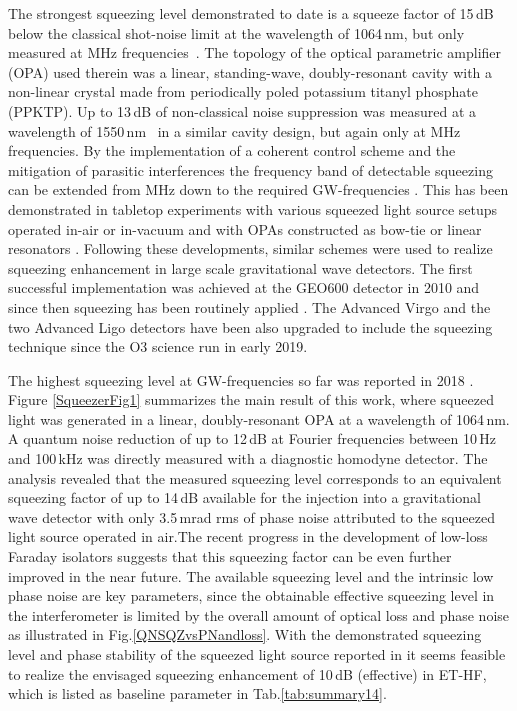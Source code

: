 %
The strongest squeezing level demonstrated to date is a squeeze factor of 15\,dB below the classical shot-noise limit at the wavelength of 1064\,nm, but only measured at MHz frequencies~\cite{Vahlbruch2016}. The topology of the optical parametric amplifier (OPA) used therein was a linear, standing-wave, doubly-resonant cavity with a non-linear crystal made from periodically poled potassium titanyl phosphate (PPKTP).  
%
Up to 13\,dB of non-classical noise suppression was measured at a wavelength of 1550\,nm~\cite{Schonbeck18} in a similar cavity design, but again only at MHz frequencies. 
%
By the implementation of a coherent control scheme \cite{Vahlbruch2006} and the mitigation of parasitic interferences the frequency band of detectable squeezing can be extended from MHz down to the required GW-frequencies \cite{Vahlbruch2007}. 
This has been demonstrated in tabletop experiments with various squeezed light source setups operated in-air or in-vacuum and with OPAs constructed as bow-tie or linear resonators \cite{Vahlbruch2006,Stefszky2012, Wade2016}.
%
Following these developments, similar schemes were used to realize squeezing enhancement in large scale gravitational wave detectors. 
The first successful implementation was achieved at the GEO600 detector in 2010 and since then squeezing has been routinely applied \cite{2011_Nat.Phys.7.962_LSC, Grote2013}. 
The Advanced Virgo and the two Advanced Ligo detectors have been also upgraded to include the squeezing technique since the O3 science run in early 2019.  
%

The highest squeezing level at GW-frequencies so far was reported in 2018 \cite{Mehmet2018}. Figure \ref{SqueezerFig1} summarizes the main result of this work, where squeezed light was generated in a linear, doubly-resonant OPA at a wavelength of 1064\,nm. A quantum noise reduction of up to 12\,dB at Fourier frequencies between 10\,Hz and 100\,kHz was directly measured with a diagnostic homodyne detector. The analysis revealed that the measured squeezing level corresponds to an equivalent squeezing factor of up to 14\,dB available for the injection into a gravitational wave detector with only 3.5\,mrad rms of phase noise attributed to the squeezed light source operated in air.The recent progress in the development of low-loss Faraday isolators \cite{Genin2018} suggests that this squeezing factor can be even further improved in the near future.
%
The available squeezing level and the intrinsic low phase noise are key parameters, since the obtainable effective squeezing level in the interferometer is limited by the overall amount of optical loss and phase noise as illustrated in Fig.\ref{QNSQZvsPNandloss}. 
%
With the demonstrated squeezing level and phase stability of the squeezed light source reported in \cite{Mehmet2018} it seems feasible to realize the envisaged squeezing enhancement of 10\,dB (effective) in ET-HF, which is listed as baseline parameter in Tab.\ref{tab:summary14}. 
 
